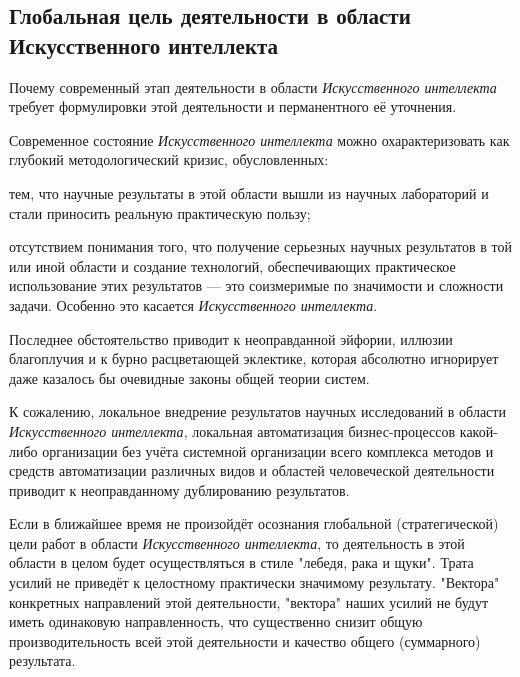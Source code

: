 \subsection*{Глобальная цель деятельности в области Искусственного интеллекта}
Почему современный этап деятельности в области \textit{Искусственного интеллекта} требует формулировки   этой деятельности и перманентного её уточнения.

Современное состояние \textit{Искусственного интеллекта} можно охарактеризовать как глубокий методологический кризис, обусловленных:
\begin{textitemize}
	\item тем, что научные результаты в этой области вышли из научных лабораторий и стали приносить реальную практическую пользу;
	\item отсутствием понимания того, что получение серьезных научных результатов в той или иной области и создание технологий, обеспечивающих  практическое использование этих результатов --- это соизмеримые по значимости и сложности задачи. Особенно это касается \textit{Искусственного интеллекта}.
\end{textitemize}

Последнее обстоятельство приводит к неоправданной эйфории, иллюзии благоплучия и к бурно расцветающей эклектике, которая абсолютно игнорирует даже казалось бы очевидные законы общей теории систем.

К сожалению, локальное внедрение результатов научных исследований в области \textit{Искусственного интеллекта}, локальная автоматизация бизнес-процессов какой-либо организации без учёта системной организации всего комплекса методов и средств автоматизации различных видов и областей человеческой деятельности приводит к неоправданному дублированию результатов. 

Если в ближайшее время не произойдёт осознания глобальной (стратегической) цели работ в области \textit{Искусственного интеллекта}, то деятельность в этой области в целом будет осуществляться в стиле "лебедя, рака и щуки"{}. Трата усилий не приведёт к целостному практически значимому результату. "Вектора"{} конкретных направлений этой деятельности, "вектора"{} наших усилий не будут иметь одинаковую направленность, что существенно снизит общую  производительность всей этой деятельности и качество общего (суммарного) результата.


